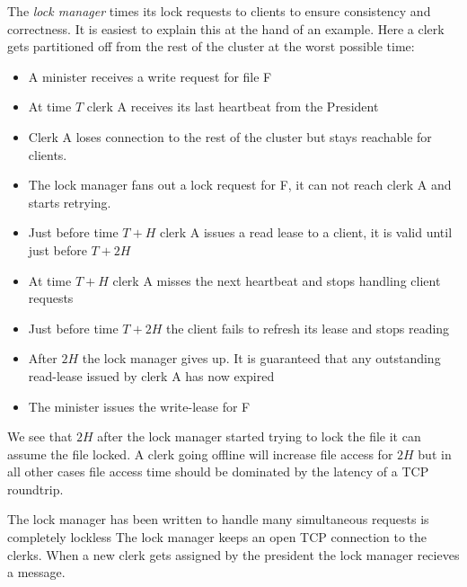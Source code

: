 The \textit{lock manager} times its lock requests to clients to ensure consistency and correctness. It is easiest to explain this at the hand of an example. Here a clerk gets partitioned off from the rest of the cluster at the worst possible time:
%
\begin{itemize}
	\item A minister receives a write request for file F
	\item At time $T$ clerk A receives its last heartbeat from the President
	\item Clerk A loses connection to the rest of the cluster but stays reachable for clients.
	\item The lock manager fans out a lock request for F, it can not reach clerk A and starts retrying.
	\item Just before time $T+H$ clerk A issues a read lease to a client, it is valid until just before $T+2H$
	\item At time $T+H$ clerk A misses the next heartbeat and stops handling client requests
	\item Just before time $T+2H$ the client fails to refresh its lease and stops reading
	\item After $2H$ the lock manager gives up. It is guaranteed that any outstanding read-lease issued by clerk A has now expired
	\item The minister issues the write-lease for F
\end{itemize}
%
We see that $2H$ after the lock manager started trying to lock the file it can assume the file locked. A clerk going offline will increase file access for $2H$ but in all other cases file access time should be dominated by the latency of a TCP roundtrip.

The lock manager has been written to handle many simultaneous requests is completely lockless
The lock manager keeps an open TCP connection to the clerks. When a new clerk gets assigned by the president the lock manager recieves a message.


